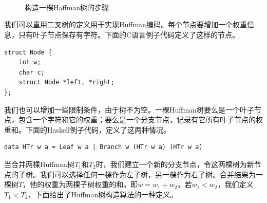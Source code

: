 \documentclass[b5paper]{ctexart}
\begin{document}
\captionsetup[subfigure]{labelformat=empty, margin=10pt}
\begin{figure}[htbp]
 \centering
  \\
  \\
  \\
 \caption{构造一棵Haffman树的步骤}
 \label{fig:huffman-build}
\end{figure}
\captionsetup[subfigure]{labelformat=parens}

我们可以重用二叉树的定义用于实现Huffman编码。每个节点要增加一个权重信息，只有叶子节点保存有字符。下面的C语言例子代码定义了这样的节点。

\lstset{language=C}
\begin{lstlisting}
struct Node {
    int w;
    char c;
    struct Node *left, *right;
};
\end{lstlisting}

我们也可以增加一些限制条件，由于树不为空。一棵Huffman树要么是一个叶子节点，包含一个字符和它的权重；要么是一个分支节点，记录有它所有叶子节点的权重和。下面的Haskell例子代码，定义了这两种情况。

\lstset{language=Haskell}
\begin{lstlisting}[style=Haskell]
data HTr w a = Leaf w a | Branch w (HTr w a) (HTr w a)
\end{lstlisting}

当合并两棵Huffman树$T_1$和$T_2$时，我们建立一个新的分支节点，令这两棵树为新节点的子树。我们可以选择任何一棵作为左子树，另一棵作为右子树。合并结果为一棵树$T$，他的权重为两棵子树权重的和。即$w = w_1 + w_2$。若$w_1 < w_2$，我们定义$T_1 < T_2$，下面给出了Huffman树构造算法的一种定义。
\end{document}
